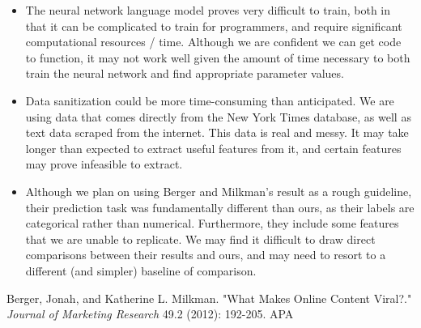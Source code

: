\documentclass[10pt]{article}
\begin{document}
\begin{itemize}
\item The neural network language model proves very difficult to train, both in that it can be complicated to train for programmers, and require significant computational resources / time. Although we are confident we can get code to function, it may not work well given the amount of time necessary to both train the neural network and find appropriate parameter values.
\item Data sanitization could be more time-consuming than anticipated. We are using data that comes directly from the New York Times database, as well as text data scraped from the internet. This data is real and messy. It may take longer than expected to extract useful features from it, and certain features may prove infeasible to extract.
\item Although we plan on using Berger and Milkman's result as a rough guideline, their prediction task was fundamentally different than ours, as their labels are categorical rather than numerical. Furthermore, they include some features that we are unable to replicate. We may find it difficult to draw direct comparisons between their results and ours, and may need to resort to a different (and simpler) baseline of comparison.
\end{itemize}

 \begin{thebibliography}{1}
 
  Berger, Jonah, and Katherine L. Milkman. "What Makes Online Content Viral?." {\em Journal of Marketing Research} 49.2 (2012): 192-205.
APA	
 
 \end{thebibliography} 


	
\end{document}
